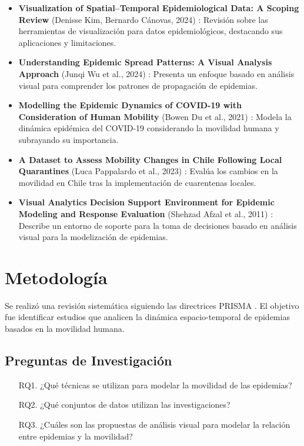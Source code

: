 \documentclass[sigconf]{acmart}
\begin{document}
\begin{itemize}
    \item \textbf{Visualization of Spatial–Temporal Epidemiological Data: A Scoping Review} (Denisse Kim, Bernardo Cánovas, 2024) \cite{kim2024scoping}: Revisión sobre las herramientas de visualización para datos epidemiológicos, destacando sus aplicaciones y limitaciones.

    \item \textbf{Understanding Epidemic Spread Patterns: A Visual Analysis Approach} (Junqi Wu et al., 2024) \cite{wu2024patterns}: Presenta un enfoque basado en análisis visual para comprender los patrones de propagación de epidemias.

    \item \textbf{Modelling the Epidemic Dynamics of COVID-19 with Consideration of Human Mobility} (Bowen Du et al., 2021) \cite{du2021dynamics}: Modela la dinámica epidémica del COVID-19 considerando la movilidad humana y subrayando su importancia.

    \item \textbf{A Dataset to Assess Mobility Changes in Chile Following Local Quarantines} (Luca Pappalardo et al., 2023) \cite{pappalardo2023dataset}: Evalúa los cambios en la movilidad en Chile tras la implementación de cuarentenas locales.

    \item \textbf{Visual Analytics Decision Support Environment for Epidemic Modeling and Response Evaluation} (Shehzad Afzal et al., 2011) \cite{afzal2011visual}: Describe un entorno de soporte para la toma de decisiones basado en análisis visual para la modelización de epidemias.
\end{itemize}

\section{Metodología}
Se realizó una revisión sistemática siguiendo las directrices PRISMA \cite{prisma2009}. El objetivo fue identificar estudios que analicen la dinámica espacio-temporal de epidemias basados en la movilidad humana.

\subsection{Preguntas de Investigación}

\begin{enumerate}
    \item[RQ1.] ¿Qué técnicas se utilizan para modelar la movilidad de las epidemias?
    \item[RQ2.] ¿Qué conjuntos de datos utilizan las investigaciones?
    \item[RQ3.] ¿Cuáles son las propuestas de análisis visual para modelar la relación entre epidemias y la movilidad?
\end{enumerate}
\end{document}
